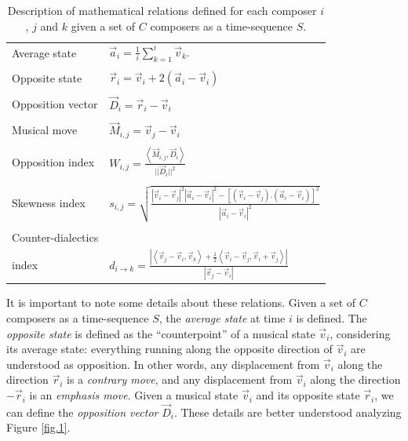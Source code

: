 \documentclass[
 aip,
 jmp,
 amsmath,amssymb,
 reprint,
]{revtex4-1}
\begin{document}
\begin{table}
\caption{\label{tab:tableRelations}Description of mathematical relations defined for each composer $i$, $j$ and $k$ given a set of $C$ composers as a time-sequence $S$.}

\begin{ruledtabular}
\begin{tabular}{ll}

\\ Average state & $\vec{a}_i = \frac{1}{i}\sum_{k=1}^i\vec{v}_k.$ \\ \\

Opposite state & $\vec{r}_i = \vec{v}_i + 2(\vec{a}_i - \vec{v}_i)$ \\ \\

Opposition vector & $\vec{D}_i=\vec{r}_i - \vec{v}_i$ \\ \\

Musical move & $\vec{M}_{i,j} = \vec{v}_j - \vec{v}_i$ \\ \\

Opposition index & $W_{i,j} = \frac{\left< \vec{M}_{i,j}, \vec{D}_i\right>}{||\vec{D}_i||^2}$ \\ \\

Skewness index & $s_{i,j} = \sqrt{\frac{|\vec{v}_i-\vec{v}_j|^2|\vec{a}_i-\vec{v}_i|^2 - [(\vec{v}_i-\vec{v}_j) . (\vec{a}_i-\vec{v}_i)]^2}{|\vec{a}_i-\vec{v}_i|^2}}$ \\ \\

Counter-dialectics \\ index & $d_{i \rightarrow k} = \frac{|\left< \vec{v}_j-\vec{v}_i,\vec{v}_k \right> + \frac{1}{2}\left<\vec{v}_i-\vec{v}_j, \vec{v}_i+\vec{v}_j\right>|}{|\vec{v}_j-\vec{v}_i|}$

\end{tabular}
\end{ruledtabular}
\end{table}

It is important to note some details about these relations. Given a set of $C$ composers as a time-sequence $S$, the \emph{average state} at time $i$ is defined. The \emph{opposite state} is defined as the ``counterpoint'' of a musical state $\vec{v}_i$, considering its average state: everything running along the opposite direction of $\vec{v}_i$ are understood as opposition. In other words, any displacement from $\vec{v}_i$ along the direction $\vec{r}_i$ is a \emph{contrary move}, and any displacement from $\vec{v}_i$ along the direction $-\vec{r}_i$ is an \emph{emphasis move}. Given a musical state $\vec{v}_i$ and its opposite state $\vec{r}_i$, we can define the \emph{opposition vector} $\vec{D}_i$. These details are better understood analyzing Figure \ref{fig.1}.
\end{document}
